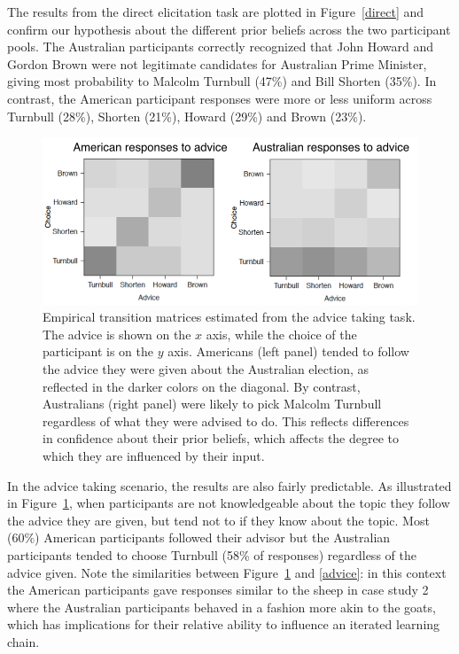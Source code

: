 \documentclass[doc]{apa6}
\begin{document}
The results from the direct elicitation task are plotted in Figure~\ref{direct} and confirm our hypothesis about the different prior beliefs across the two participant pools. The Australian participants correctly recognized that John Howard and Gordon Brown were not legitimate candidates for Australian Prime Minister, giving most probability to Malcolm Turnbull (47\%) and Bill Shorten (35\%). In contrast, the American participant responses were more or less uniform across Turnbull (28\%), Shorten (21\%), Howard (29\%) and Brown (23\%).

\begin{figure}[t]
\begin{center}
\includegraphics[width=12cm]{transitionsozelection.png}
\caption{\small{Empirical transition matrices estimated from the {\sc advice taking} task. The advice is shown on the $x$ axis, while the choice of the participant is on the $y$ axis. Americans (left panel) tended to follow the advice they were given about the Australian election, as reflected in the darker colors on the diagonal. By contrast, Australians (right panel) were likely to pick Malcolm Turnbull regardless of what they were advised to do. This reflects differences in confidence about their prior beliefs, which affects the degree to which they are influenced by their input.}}
\label{transitionsozelection}
\end{center}
\end{figure}

In the {\sc advice taking} scenario, the results are also fairly predictable. As illustrated in Figure~\ref{transitionsozelection}, when participants are not knowledgeable about the topic they follow the advice they are given, but tend not to if they know about the topic. Most (60\%) American participants followed their advisor but the Australian participants tended to choose Turnbull (58\% of responses) regardless of the advice given. Note the similarities between Figure~\ref{transitionsozelection} and \ref{advice}: in this context the American participants gave responses similar to the {\sc sheep} in case study 2 where the Australian participants behaved in a fashion more akin to the {\sc goats}, which has implications for their relative ability to influence an iterated learning chain.
\end{document}
